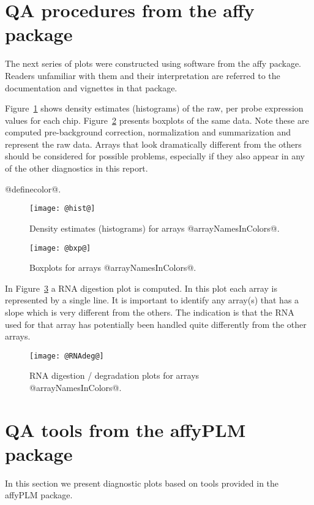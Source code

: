 \documentclass[11pt]{article}
\newcommand{\Rpackage}[1]{{\textsf{#1}}}
\begin{document}
\section{QA procedures from the \Rpackage{affy} package}

The next series of plots were constructed using software from the 
\Rpackage{affy} package. Readers unfamiliar with them and their
interpretation are referred to the documentation and vignettes in
that package.

Figure~\ref{fig:hist} shows density estimates (histograms) of the raw, 
per probe expression values for each chip. Figure~\ref{fig:bxp}
presents boxplots of the same data.  Note these are computed pre-background
correction, normalization and summarization and represent the raw
data. Arrays that look dramatically different from the others should be 
considered for possible problems, especially if they also appear in any
of the other diagnostics in this report.

@definecolor@.

\begin{figure}[tp]
  \centering
\texttt{[image: @hist@]}
\caption{\label{fig:hist}%
Density estimates (histograms) for arrays @arrayNamesInColors@.}
\end{figure}

\begin{figure}[tp]
  \centering
\texttt{[image: @bxp@]}
\caption{\label{fig:bxp}%
Boxplots for arrays @arrayNamesInColors@.}
\end{figure}


In Figure~\ref{fig:rnadeg} a RNA digestion plot is computed. In this plot
each array is represented by a single line. It is important to identify 
any array(s) that has a slope which is very different from the others. 
The indication is that the RNA used for that array has potentially 
been handled quite differently from the other arrays. 

\begin{figure}[tp]
  \centering
\texttt{[image: @RNAdeg@]}
\caption{\label{fig:rnadeg}%
RNA digestion / degradation plots for arrays @arrayNamesInColors@.}
\end{figure}

\section{QA tools from the \Rpackage{affyPLM} package}

In this section we present diagnostic plots based on tools provided
in the \Rpackage{affyPLM} package.
\end{document}
